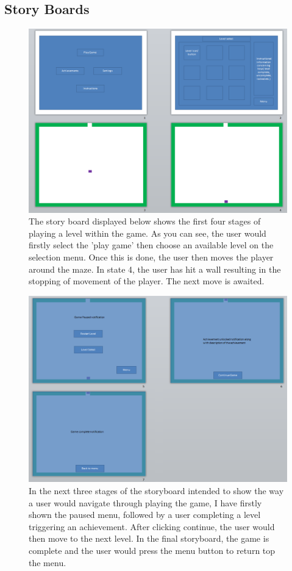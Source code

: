 \documentclass[a4paper]{article}
\begin{document}
\begin{landscape}
  \subsection{Story Boards}
\begin{figure}[!ht]
   \centering
   \includegraphics[scale=0.65]{story1.png}
  \caption{The story board displayed below shows the first four stages of
playing a level within the game. As you can see, the user would firstly select
the 'play game' then choose an available level on the selection menu. Once this
is done, the user then moves the player around the maze. In state 4, the user
has hit a wall resulting in the stopping of movement of the player. The next
move is awaited.}
   \end{figure}
\end{landscape}
\clearpage
\begin{landscape}
\begin{figure}[!ht]
   \centering
   \includegraphics[scale=0.8]{story2.png}
  \caption{In the next three stages of the storyboard intended to show the way a
user would navigate through playing the game, I have firstly shown the paused
menu, followed by a user completing a level triggering an achievement. After
clicking continue, the user would then move to the next level. In the final
storyboard, the game is complete and the user would press the menu button to
return top the menu.}
   \end{figure}
\end{landscape}
\clearpage
\end{document}
